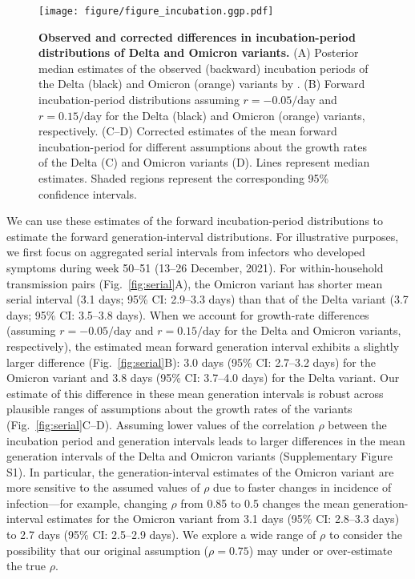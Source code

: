 \documentclass[12pt]{article}
\newcommand{\fref}[1]{Fig.~\ref{fig:#1}}
\begin{document}
\begin{figure}[!th]
\texttt{[image: figure/figure\_incubation.ggp.pdf]}
\caption{
\textbf{Observed and corrected differences in incubation-period distributions of Delta and Omicron variants.}
(A) Posterior median estimates of the observed (backward) incubation periods of the Delta (black) and Omicron (orange) variants by \cite{backer2021omicron}.
(B) Forward incubation-period distributions assuming $r=-0.05/\mathrm{day}$ and $r=0.15/\mathrm{day}$ for the Delta (black) and Omicron (orange) variants, respectively.
(C--D) Corrected estimates of the mean forward incubation-period for different assumptions about the growth rates of the Delta (C) and Omicron variants (D).
Lines represent median estimates.
Shaded regions represent the corresponding 95\% confidence intervals.
\label{fig:incubation}
}
\end{figure}

We can use these estimates of the forward incubation-period distributions to estimate the forward generation-interval distributions.
For illustrative purposes, we first focus on aggregated serial intervals from infectors who developed symptoms during week 50--51 (13--26 December, 2021).
For within-household transmission pairs (\fref{serial}A), the Omicron variant has shorter mean serial interval (3.1 days; 95\% CI: 2.9--3.3 days) than that of the Delta variant (3.7 days; 95\% CI: 3.5--3.8 days).
When we account for growth-rate differences (assuming $r=-0.05/\mathrm{day}$ and $r=0.15/\mathrm{day}$ for the Delta and Omicron variants, respectively), the estimated mean forward generation interval exhibits a slightly larger difference (\fref{serial}B):
3.0 days (95\% CI: 2.7--3.2 days) for the Omicron variant and 3.8 days (95\% CI: 3.7--4.0 days) for the Delta variant.
Our estimate of this difference in these mean generation intervals is robust across plausible ranges of assumptions about the growth rates of the variants (\fref{serial}C--D).
Assuming lower values of the correlation $\rho$ between the incubation period and generation intervals leads to larger differences in the mean generation intervals of the Delta and Omicron variants (Supplementary Figure S1).
In particular, the generation-interval estimates of the Omicron variant are more sensitive to the assumed values of $\rho$ due to faster changes in incidence of infection---for example, changing $\rho$ from 0.85 to 0.5 changes the mean generation-interval estimates for the Omicron variant from 3.1 days (95\% CI: 2.8--3.3 days) to 2.7 days (95\% CI: 2.5--2.9 days).
We explore a wide range of $\rho$ to consider the possibility that our original assumption ($\rho=0.75$) may under or over-estimate the true $\rho$.
\end{document}
